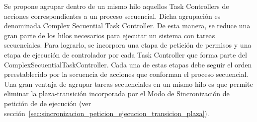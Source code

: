 Se propone agrupar dentro de un mismo hilo aquellos Task Controllers de acciones
correspondientes a un proceso secuencial. Dicha agrupación es denominada
Complex Secuential Task Controller. De esta manera, se reduce una gran parte de
los hilos necesarios para ejecutar un sistema con tareas secuenciales.
Para lograrlo, se incorpora una etapa de petición de permisos y una etapa de
ejecución de controlador por cada Task Controller que forma parte del
ComplexSecuentialTaskController. Cada una de estas etapas debe seguir el orden
preestablecido por la secuencia de acciones que conforman el proceso secuencial.
Una gran ventaja de agrupar tareas
secuenciales en un mismo hilo es que permite eliminar la plaza-transición incorporada por el Modo de
Sincronización de petición de de ejecución (ver
sección~\ref{sec:sincronizacion_peticion_ejecucion_transicion_plaza}).

